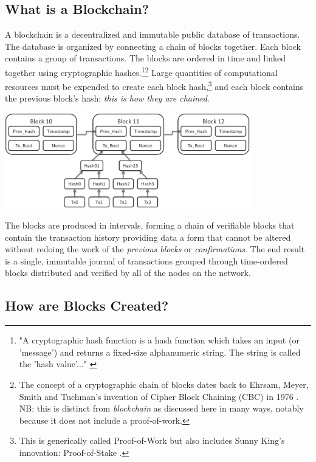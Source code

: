 \documentclass[11pt]{article}
\begin{document}
\subsection{What is a Blockchain?}

A blockchain is a decentralized and immutable public database of transactions. 
The database is organized by connecting a chain of blocks together.
Each block contains a group of transactions.
The blocks are ordered in time and linked together using cryptographic hashes.\footnote{"A cryptographic hash function is a hash function which takes an input (or 'message') and returns a fixed-size alphanumeric string. The string is called the 'hash value'..." \cite{wikihash}}\footnote{The concept of a cryptographic chain of blocks dates back to Ehrsam, Meyer, Smith and Tuchman's invention of Cipher Block Chaining (CBC) in 1976 \cite{cbc}. NB: this is distinct from \textit{blockchain} as discussed here in many ways, notably because it does not include a proof-of-work.}
Large quantities of computational resources must be expended to create each block hash,\footnote{This is generically called Proof-of-Work but also includes Sunny King's innovation: Proof-of-Stake \cite{peercoin}.} and each block contains the previous block's hash: \textit{this is how they are chained}.

\begin{center}
\includegraphics[width=0.80\textwidth]{./blockchain.png}
\end{center}
The blocks are produced in intervals, forming a chain of verifiable blocks that contain the transaction history providing data a form that cannot be altered without redoing the work of the \textit{previous blocks} or \textit{confirmations}.
The end result is a single, immutable journal of transactions grouped through time-ordered blocks distributed and verified by all of the nodes on the network.


\subsection{How are Blocks Created?}
\end{document}
